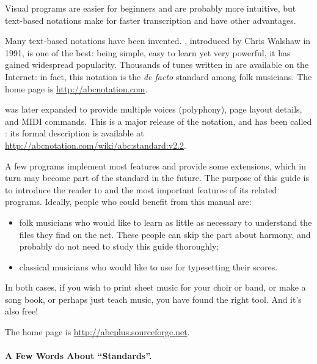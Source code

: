 \documentclass[a4paper,12pt]{book}
\begin{document}
Visual programs are easier for beginners and are probably more
intuitive, but text-based notations make for faster transcription and
have other advantages.

Many text-based notations have been invented. \ABC{}, introduced by
Chris Walshaw in 1991, is one of the best: being simple, easy to learn
yet very powerful, it has gained widespread popularity. Thousands of
tunes written in \ABC{} are available on the Internet: in fact, this
notation is the \emph{de facto} standard among folk musicians. The
\ABC{} home page is \url{http://abcnotation.com}.

\ABC{} was later expanded to provide multiple voices
(po\-ly\-pho\-ny), page layout details, and MIDI commands. This is a
major release of the \ABC{} notation, and has been called \ABCPLUS:
its formal description is available at
\url{http://abcnotation.com/wiki/abc:standard:v2.2}.

A few programs implement most \ABCPLUS{} features and provide some
extensions, which in turn may become part of the \ABC{} standard in
the future. The purpose of this guide is to introduce the reader to
\ABCPLUS{} and the most important features of its related programs.
Ideally, people who could benefit from this manual are:

\begin{itemize}
  
  \item folk musicians who would like to learn as little \ABC{} as
  necessary to understand the files they find on the net. These people
  can skip the part about harmony, and probably do not need to study
  this guide thoroughly;
  
  \item classical musicians who would like to use \ABCPLUS{} for
  typesetting their scores.
  
\end{itemize}

In both cases, if you wish to print sheet music for your choir or
band, or make a song book, or perhaps just teach music, you have found
the right tool. And it's also free!

The \ABCPLUS{} home page is \url{http://abcplus.sourceforge.net}.

\paragraph{A Few Words About ``Standards''.}

\end{document}
